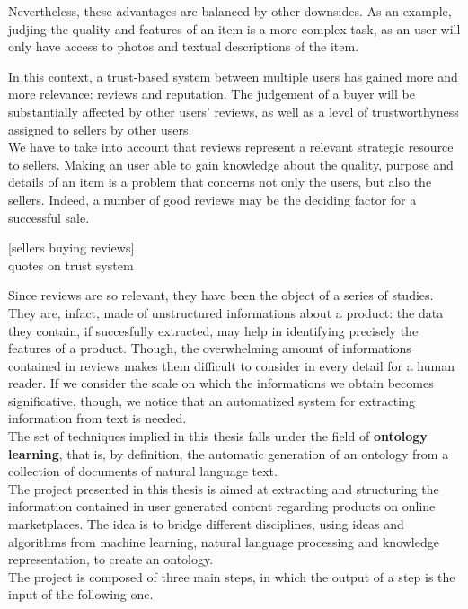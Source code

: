 \documentclass[LaM,binding=0.6cm]{sapthesis}
\begin{document}
 Nevertheless, these advantages are balanced by other downsides. As an example, judjing the quality and features of an item is a more complex task, as an user will only have access to photos and textual descriptions of the item.

 In this context, a trust-based system between multiple users has gained more and more relevance: reviews and reputation. The judgement of a buyer will be substantially affected by other users' reviews, as well as a level of trustworthyness assigned to sellers by other users. \\

 We have to take into account that reviews represent a relevant strategic resource to sellers.
 Making an user able to gain knowledge about the quality, purpose and details of an item is a problem that concerns not only the users, but also the sellers. Indeed, a number of good reviews may be the deciding factor for a successful sale. 

 [sellers buying reviews] \\
 quotes on trust system

 \bigskip

 Since reviews are so relevant, they have been the object of a series of studies. They are, infact, made of unstructured informations about a product: the data they contain, if succesfully extracted, may help in identifying precisely the features of a product. Though, the overwhelming amount of informations contained in reviews makes them difficult to consider in every detail for a human reader. If we consider the scale on which the informations we obtain becomes significative, though, we notice that an automatized system for extracting information from text is needed. \\ 

 The set of techniques implied in this thesis falls under the field of \textbf{ontology learning}, that is, by definition, the automatic generation of an ontology from a collection of documents of natural language text. \\

 The project presented in this thesis is aimed at extracting and structuring the information contained in user generated content regarding products on online marketplaces. The idea is to bridge different disciplines, using ideas and algorithms from machine learning, natural language processing and knowledge representation, to create an ontology. \\

 The project is composed of three main steps, in which the output of a step is the input of the following one.
\end{document}
